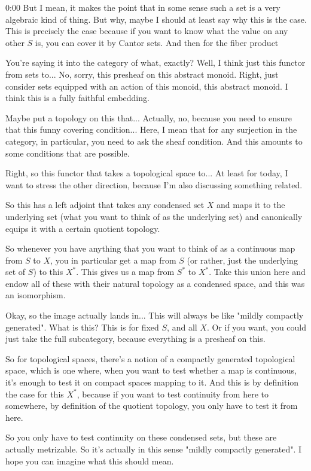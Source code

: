 \begin{unfinished}{0:00}
But I mean, it makes the point that in some sense such a set is a very algebraic kind of thing. But why, maybe I should at least say why this is the case. This is precisely the case because if you want to know what the value on any other $S$ is, you can cover it by Cantor sets. And then for the fiber product

You're saying it into the category of what, exactly? Well, I think just this functor from sets to... No, sorry, this presheaf on this abstract monoid. Right, just consider sets equipped with an action of this monoid, this abstract monoid. I think this is a fully faithful embedding.

Maybe put a topology on this that... Actually, no, because you need to ensure that this funny covering condition... Here, I mean that for any surjection in the category, in particular, you need to ask the sheaf condition. And this amounts to some conditions that are possible.

Right, so this functor that takes a topological space to... At least for today, I want to stress the other direction, because I'm also discussing something related.

So this has a left adjoint that takes any condensed set $X$ and maps it to the underlying set (what you want to think of as the underlying set) and canonically equips it with a certain quotient topology.

So whenever you have anything that you want to think of as a continuous map from $S$ to $X$, you in particular get a map from $S$ (or rather, just the underlying set of $S$) to this $X^*$. This gives us a map from $S^*$ to $X^*$. Take this union here and endow all of these with their natural topology as a condensed space, and this was an isomorphism.

Okay, so the image actually lands in... This will always be like "mildly compactly generated". What is this? This is for fixed $S$, and all $X$. Or if you want, you could just take the full subcategory, because everything is a presheaf on this.

So for topological spaces, there's a notion of a compactly generated topological space, which is one where, when you want to test whether a map is continuous, it's enough to test it on compact spaces mapping to it. And this is by definition the case for this $X^*$, because if you want to test continuity from here to somewhere, by definition of the quotient topology, you only have to test it from here.

So you only have to test continuity on these condensed sets, but these are actually metrizable. So it's actually in this sense "mildly compactly generated". I hope you can imagine what this should mean.


\end{unfinished}
